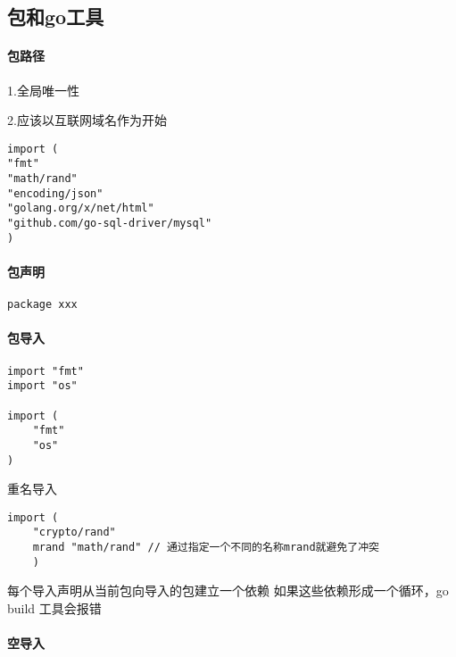 \hypertarget{ux5305ux548cgoux5de5ux5177}{%
\subsection{包和go工具}\label{ux5305ux548cgoux5de5ux5177}}

\hypertarget{ux5305ux8defux5f84}{%
\paragraph{包路径}\label{ux5305ux8defux5f84}}

1.全局唯一性

2.应该以互联网域名作为开始

\begin{verbatim}
import ( 
"fmt"
"math/rand"
"encoding/json"
"golang.org/x/net/html" 
"github.com/go-sql-driver/mysql"
)
\end{verbatim}

\hypertarget{ux5305ux58f0ux660e}{%
\paragraph{包声明}\label{ux5305ux58f0ux660e}}

\begin{verbatim}
package xxx
\end{verbatim}

\hypertarget{ux5305ux5bfcux5165}{%
\paragraph{包导入}\label{ux5305ux5bfcux5165}}

\begin{verbatim}
import "fmt" 
import "os"

import ( 
    "fmt" 
    "os"
)
\end{verbatim}

重名导入

\begin{verbatim}
import ( 
    "crypto/rand"
    mrand "math/rand" // 通过指定一个不同的名称mrand就避免了冲突
    )
\end{verbatim}

每个导入声明从当前包向导入的包建立一个依赖 如果这些依赖形成一个循环，go
build 工具会报错

\hypertarget{ux7a7aux5bfcux5165}{%
\paragraph{空导入}\label{ux7a7aux5bfcux5165}}

